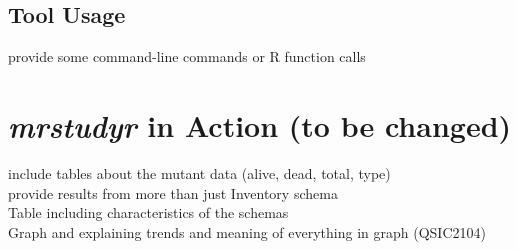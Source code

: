 \documentclass[conference]{IEEEtran}
\begin{document}
\subsection{Tool Usage}
provide some command-line commands or R function calls

\vspace*{-0.25cm}
\section{\textit{mrstudyr} in Action (to be changed)}

include tables about the mutant data (alive, dead, total, type) \\
provide results from more than just Inventory schema \\
Table including characteristics of the schemas \\
Graph and explaining trends and meaning of everything in graph (QSIC2104)
\end{document}
